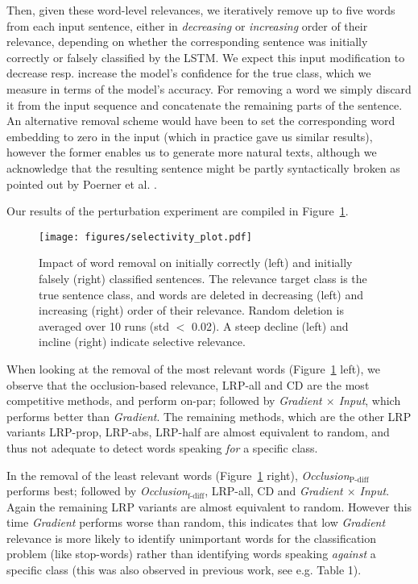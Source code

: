 \documentclass[runningheads]{llncs}
\begin{document}
Then, given these word-level relevances, we iteratively remove up to five words from each input sentence, either in {\it decreasing} or {\it increasing} order of their relevance, depending on whether the corresponding sentence was initially correctly or falsely classified by the LSTM. We expect this input modification to decrease resp. increase the model's confidence for the true class, which we measure in terms of the model's accuracy. 
For removing a word we simply discard it from the input sequence and concatenate the remaining parts of the sentence. An alternative removal scheme would have been to set the corresponding word embedding to zero in the input (which in practice gave us similar results), however the former enables us to generate more natural texts, although we acknowledge that the resulting sentence might be partly syntactically broken as pointed out by Poerner et al. \cite{Arr:Poerner:ACL2018}.

Our results of the perturbation experiment are compiled in Figure~\ref{Arr:fig:selectivity_experiment}.

\begin{figure}[th!]
	\centering
	\texttt{[image: figures/selectivity\_plot.pdf]}
	\caption{Impact of word removal on initially correctly (left) and initially falsely (right) classified sentences. The relevance target class is the true sentence class, and words are deleted in decreasing (left) and increasing (right) order of their relevance. Random deletion is averaged over 10 runs (std $<$ 0.02). A steep decline (left) and incline (right) indicate selective relevance.}
	\label{Arr:fig:selectivity_experiment}
\end{figure}


When looking at the removal of the most relevant words (Figure~\ref{Arr:fig:selectivity_experiment} left), we observe that the occlusion-based relevance, LRP-all and CD are the most competitive methods, and perform on-par;
followed by  {\it Gradient $\times$ Input}, which performs better than {\it Gradient}.
The remaining methods, which are the other LRP variants LRP-prop, LRP-abs, LRP-half are almost equivalent to random, and thus not adequate to detect words speaking {\it for} a specific class.

In the removal of the least relevant words (Figure~\ref{Arr:fig:selectivity_experiment} right), {\it Occlusion}$_\text{P-diff}$ performs best; followed by {\it Occlusion}$_\text{f-diff}$, LRP-all, {CD} and {\it Gradient $\times$ Input}.
Again the remaining LRP variants are almost equivalent to random. However this time {\it Gradient} performs worse than random, this indicates that low {\it Gradient} relevance is more likely to identify unimportant words for the classification problem (like stop-words) rather than identifying words speaking {\it against} a specific class (this was also observed in previous work, see e.g. \cite{Arr:Arras:17} Table 1).
\end{document}
